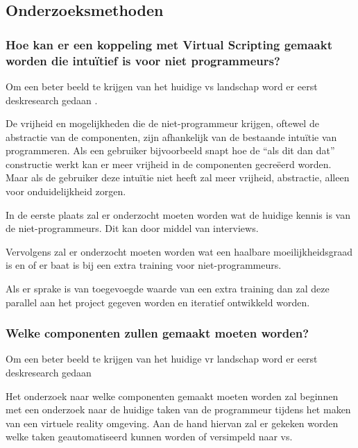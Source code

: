 \subsection{Onderzoeksmethoden}
\label{subsec:onderzoeksmethoden}

\subsubsection{Hoe kan er een koppeling met Virtual Scripting gemaakt worden die intuïtief is voor niet programmeurs?}

Om een beter beeld te krijgen van het huidige \gls{vs} landschap word er eerst deskresearch gedaan \cite{Cutumisu200732, ambientbehav, PANE2001237}.

De vrijheid en mogelijkheden die de niet-programmeur krijgen, oftewel de abstractie van de componenten, zijn afhankelijk van de bestaande intuïtie van programmeren. Als een gebruiker bijvoorbeeld snapt hoe de “als dit dan dat” constructie werkt kan er meer vrijheid in de componenten gecreëerd worden. Maar als de gebruiker deze intuïtie niet heeft zal meer vrijheid, abstractie, alleen voor onduidelijkheid zorgen.

In de eerste plaats zal er onderzocht moeten worden wat de huidige kennis is van de niet-programmeurs. Dit kan door middel van interviews.

Vervolgens zal er onderzocht moeten worden wat een haalbare moeilijkheidsgraad is en of er baat is bij een extra training voor niet-programmeurs.

Als er sprake is van toegevoegde waarde van een extra training dan zal deze parallel aan het project gegeven worden en iteratief ontwikkeld worden.

\subsubsection{Welke componenten zullen gemaakt moeten worden?}

Om een beter beeld te krijgen van het huidige \gls{vr} landschap word er eerst deskresearch gedaan \cite{Bauer2015,7131757,Mine:2003:TVR:769953.769955,Pausch:1996:DAF:237170.237257,Mine:2003:TVR:769953.769955}

Het onderzoek naar welke componenten gemaakt moeten worden zal beginnen met een onderzoek naar de huidige taken van de programmeur tijdens het maken van een virtuele reality omgeving. Aan de hand hiervan zal er gekeken worden welke taken geautomatiseerd kunnen worden of versimpeld naar \gls{vs}.

